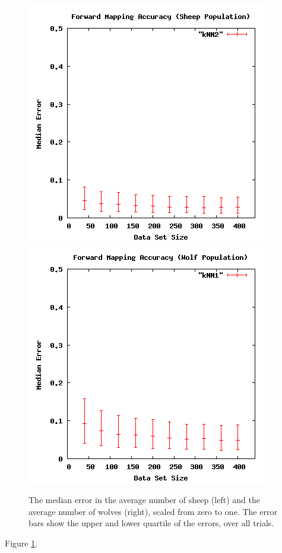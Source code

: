 \begin{figure}[ht]
\centering
\includegraphics[scale=.4]{images/results_wolfsheep/fm-sheep-pop.png}
\includegraphics[scale=.4]{images/results_wolfsheep/fm-wolf-pop.png}
\caption{The median error in the average number of sheep (left) and the average number of wolves (right), scaled from zero to one.
The error bars show the upper and lower quartile of the errors, over all trials.}
\label{fig:wolfsheeppop}
\end{figure}

Figure \ref{fig:wolfsheeppop}.

